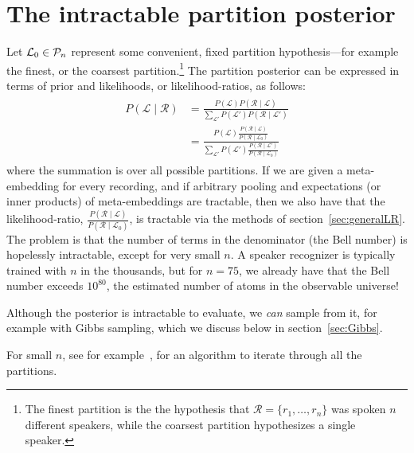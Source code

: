 \documentclass[a4paper,oneside,12pt,english]{report}
\def\Lset{\mathcal{L}}
\def\Rset{\mathcal{R}}
\begin{document}
 
\section{The intractable partition posterior}
Let $\Lset_0\in\Pset_n$ represent some convenient, fixed partition hypothesis---for example the finest, or the coarsest partition.\footnote{The finest partition is the the hypothesis that $\Rset=\{r_1,\ldots,r_n\}$ was spoken $n$ different speakers, while the coarsest partition hypothesizes a single speaker.} The partition posterior can be expressed in terms of prior and likelihoods, or likelihood-ratios, as follows:
\begin{align}
\begin{split}
P(\Lset\mid\Rset) &= \frac{P(\Lset)P(\Rset\mid\Lset)}{\sum_{\Lset'} P(\Lset')P(\Rset\mid\Lset')}\\
&= \frac{P(\Lset)\frac{P(\Rset\mid\Lset)}{P(\Rset\mid\Lset_0)}}{\sum_{\Lset'} P(\Lset')\frac{P(\Rset\mid\Lset')}{P(\Rset\mid\Lset_0)}}
\end{split}
\end{align} 
where the summation is over all possible partitions. If we are given a meta-embedding for every recording, and if arbitrary pooling and expectations (or inner products) of meta-embeddings are tractable, then we also have that the likelihood-ratio, $\frac{P(\Rset\mid\Lset)}{P(\Rset\mid\Lset_0)}$, is tractable via the methods of section~\ref{sec:generalLR}. The problem is that the number of terms in the denominator (the Bell number) is hopelessly intractable, except for very small $n$. A speaker recognizer is typically trained with $n$ in the thousands, but for $n=75$, we already have that the Bell number exceeds $10^{80}$, the estimated number of atoms in the observable universe!

Although the posterior is intractable to evaluate, we \emph{can} sample from it, for example with Gibbs sampling, which we discuss below in section~\ref{sec:Gibbs}.

For small $n$, see for example~\cite{orlov}, for an algorithm to iterate through all the partitions.
\end{document}
